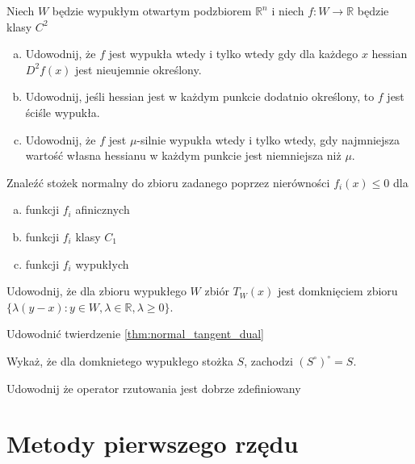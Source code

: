 \documentclass[10pt,a4paper,draft]{report}
\begin{document}
\begin{problem}
Niech $W$ będzie wypukłym otwartym podzbiorem $\mathbb{R}^n$ i niech $f : W \rightarrow \mathbb{R}$ będzie klasy $C^2$
\begin{enumerate}[a)]
\item Udowodnij, że $f$ jest wypukła wtedy i tylko wtedy gdy dla każdego $x$ hessian $D^2 f(x)$ jest nieujemnie określony.
\item Udowodnij, jeśli hessian jest w każdym punkcie dodatnio określony, to $f$ jest ściśle wypukła.
\item Udowodnij, że $f$ jest $\mu$-silnie wypukła wtedy i tylko wtedy, gdy najmniejsza wartość własna hessianu w każdym punkcie jest niemniejsza niż $\mu$.
\end{enumerate}
\end{problem}




\begin{problem}
Znaleźć stożek normalny do zbioru zadanego poprzez nierówności $f_i(x) \leq 0$ dla
\begin{enumerate}[a)]
\item funkcji $f_i$ afinicznych
\item funkcji $f_i$ klasy $C_1$
\item funkcji $f_i$ wypukłych
\end{enumerate}

\end{problem}
\begin{problem}
Udowodnij, że dla zbioru wypukłego $W$ zbiór $T_W(x)$ jest domknięciem zbioru $\{ \lambda(y - x) : y \in W, \lambda \in \mathbb{R}, \lambda \geq 0\}$. 
\end{problem}
\begin{problem}
Udowodnić twierdzenie \ref{thm:normal_tangent_dual}
\end{problem}
\begin{problem}
Wykaż, że dla domknietego wypukłego stożka $S$, zachodzi $(S^{\circ})^{\circ} = S$.
\end{problem}
\begin{problem}
Udowodnij że operator rzutowania jest dobrze zdefiniowany
\end{problem}




\chapter{Metody pierwszego rzędu}
\end{document}
